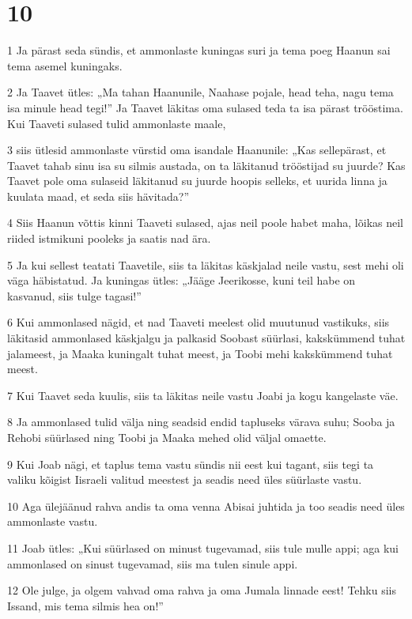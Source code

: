 \chapter{10}

\par 1 Ja pärast seda sündis, et ammonlaste kuningas suri ja tema poeg Haanun sai tema asemel kuningaks.
\par 2 Ja Taavet ütles: „Ma tahan Haanunile, Naahase pojale, head teha, nagu tema isa minule head tegi!” Ja Taavet läkitas oma sulased teda ta isa pärast trööstima. Kui Taaveti sulased tulid ammonlaste maale,
\par 3 siis ütlesid ammonlaste vürstid oma isandale Haanunile: „Kas sellepärast, et Taavet tahab sinu isa su silmis austada, on ta läkitanud trööstijad su juurde? Kas Taavet pole oma sulaseid läkitanud su juurde hoopis selleks, et uurida linna ja kuulata maad, et seda siis hävitada?”
\par 4 Siis Haanun võttis kinni Taaveti sulased, ajas neil poole habet maha, lõikas neil riided istmikuni pooleks ja saatis nad ära.
\par 5 Ja kui sellest teatati Taavetile, siis ta läkitas käskjalad neile vastu, sest mehi oli väga häbistatud. Ja kuningas ütles: „Jääge Jeerikosse, kuni teil habe on kasvanud, siis tulge tagasi!”
\par 6 Kui ammonlased nägid, et nad Taaveti meelest olid muutunud vastikuks, siis läkitasid ammonlased käskjalgu ja palkasid Soobast süürlasi, kakskümmend tuhat jalameest, ja Maaka kuningalt tuhat meest, ja Toobi mehi kakskümmend tuhat meest.
\par 7 Kui Taavet seda kuulis, siis ta läkitas neile vastu Joabi ja kogu kangelaste väe.
\par 8 Ja ammonlased tulid välja ning seadsid endid tapluseks värava suhu; Sooba ja Rehobi süürlased ning Toobi ja Maaka mehed olid väljal omaette.
\par 9 Kui Joab nägi, et taplus tema vastu sündis nii eest kui tagant, siis tegi ta valiku kõigist Iisraeli valitud meestest ja seadis need üles süürlaste vastu.
\par 10 Aga ülejäänud rahva andis ta oma venna Abisai juhtida ja too seadis need üles ammonlaste vastu.
\par 11 Joab ütles: „Kui süürlased on minust tugevamad, siis tule mulle appi; aga kui ammonlased on sinust tugevamad, siis ma tulen sinule appi.
\par 12 Ole julge, ja olgem vahvad oma rahva ja oma Jumala linnade eest! Tehku siis Issand, mis tema silmis hea on!”
